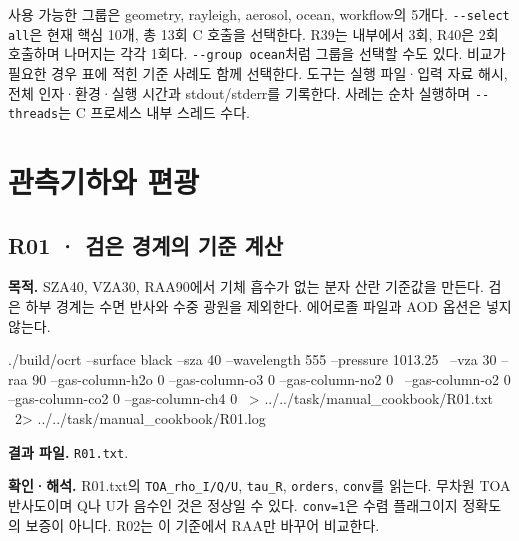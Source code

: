 사용 가능한 그룹은 geometry, rayleigh, aerosol, ocean, workflow의 5개다. \texttt{-\allowbreak{}-\allowbreak{}select all}은 현재 핵심 10개, 총 13회 C 호출을 선택한다. R39는 내부에서 3회, R40은 2회 호출하며 나머지는 각각 1회다. \texttt{-\allowbreak{}-\allowbreak{}group ocean}처럼 그룹을 선택할 수도 있다. 비교가 필요한 경우 표에 적힌 기준 사례도 함께 선택한다. 도구는 실행 파일·입력 자료 해시, 전체 인자·환경·실행 시간과 stdout/stderr를 기록한다. 사례는 순차 실행하며 \texttt{-\allowbreak{}-\allowbreak{}threads}는 C 프로세스 내부 스레드 수다.

\clearpage

\section{관측기하와 편광}

\label{sec:auto:09_cookbook:2}

\label{sec:cookbook_group:geometry}

\subsection{R01 · 검은 경계의 기준 계산}
\label{sec:auto:09_cookbook:2.1}

\label{recipe:R01}

\textbf{목적. }SZA40\textdegree{}, VZA30\textdegree{}, RAA90\textdegree{}에서 기체 흡수가 없는 분자 산란 기준값을 만든다. 검은 하부 경계는 수면 반사와 수중 광원을 제외한다. 에어로졸 파일과 AOD 옵션은 넣지 않는다.

\noindent\begin{minipage}{\linewidth}
\begin{ManualCode}

./build/ocrt --surface black --sza 40 --wavelength 555 --pressure 1013.25 \
  --vza 30 --raa 90 --gas-column-h2o 0 --gas-column-o3 0 --gas-column-no2 0 \
  --gas-column-o2 0 --gas-column-co2 0 --gas-column-ch4 0 \
  > ../../task/manual_cookbook/R01.txt \
  2> ../../task/manual_cookbook/R01.log

\end{ManualCode}
\end{minipage}\par

\textbf{결과 파일. }\texttt{R01.txt}.

\textbf{확인·해석. }R01.txt의 \texttt{TOA\_\allowbreak{}rho\_\allowbreak{}I/\allowbreak{}Q/\allowbreak{}U}, \texttt{tau\_\allowbreak{}R}, \texttt{orders}, \texttt{conv}를 읽는다. 무차원 TOA 반사도이며 Q나 U가 음수인 것은 정상일 수 있다. \texttt{conv=\allowbreak{}1}은 수렴 플래그이지 정확도의 보증이 아니다. R02는 이 기준에서 RAA만 바꾸어 비교한다.

